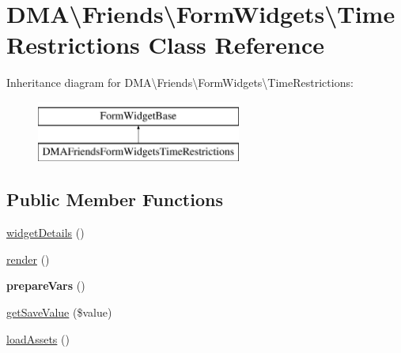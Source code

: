 \hypertarget{classDMA_1_1Friends_1_1FormWidgets_1_1TimeRestrictions}{}\section{D\+M\+A\textbackslash{}Friends\textbackslash{}Form\+Widgets\textbackslash{}Time\+Restrictions Class Reference}
\label{classDMA_1_1Friends_1_1FormWidgets_1_1TimeRestrictions}
Inheritance diagram for D\+M\+A\textbackslash{}Friends\textbackslash{}Form\+Widgets\textbackslash{}Time\+Restrictions\+:\begin{figure}[H]
\begin{center}
\leavevmode
\includegraphics[height=2.000000cm]{dc/d09/classDMA_1_1Friends_1_1FormWidgets_1_1TimeRestrictions}
\end{center}
\end{figure}
\subsection*{Public Member Functions}
\begin{DoxyCompactItemize}
\item 
\hyperlink{classDMA_1_1Friends_1_1FormWidgets_1_1TimeRestrictions_a74be261bb83b3287ff8ea66f1f148f89}{widget\+Details} ()
\item 
\hyperlink{classDMA_1_1Friends_1_1FormWidgets_1_1TimeRestrictions_a24e7d7ab71003ca1fbff26b8c015c66e}{render} ()
\item 
\hypertarget{classDMA_1_1Friends_1_1FormWidgets_1_1TimeRestrictions_a3a508c4fc9687a575a7e88c239c0a4f2}{}{\bfseries prepare\+Vars} ()\label{classDMA_1_1Friends_1_1FormWidgets_1_1TimeRestrictions_a3a508c4fc9687a575a7e88c239c0a4f2}

\item 
\hyperlink{classDMA_1_1Friends_1_1FormWidgets_1_1TimeRestrictions_a2f377f9ea0d35b343a038af655e7324d}{get\+Save\+Value} (\$value)
\item 
\hyperlink{classDMA_1_1Friends_1_1FormWidgets_1_1TimeRestrictions_a8cbd7604a8116dcbdaf06b1f6e754a41}{load\+Assets} ()
\end{DoxyCompactItemize}



